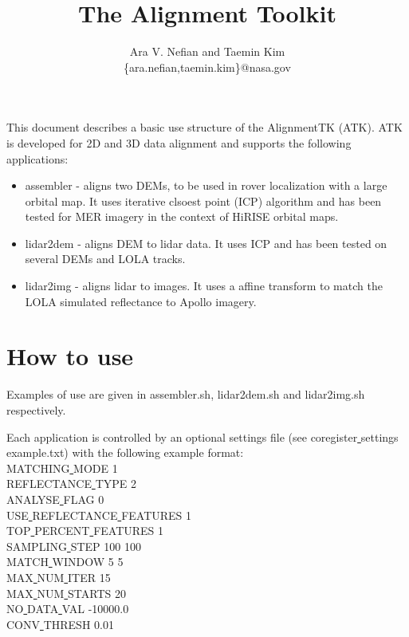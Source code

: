\documentclass[12pt]{article}
\begin{document}
\title {The Alignment Toolkit}
\author{Ara V. Nefian and Taemin Kim\\
\{ara.nefian,taemin.kim\}@nasa.gov}
\maketitle

This document describes a basic use structure of the AlignmentTK (ATK). ATK is developed for 2D and 3D data alignment and supports the 
following applications:
\begin{itemize}
\item assembler - aligns two DEMs, to be used in rover localization with a large orbital map. It uses iterative clsoest point (ICP) algorithm and has 
been tested for MER imagery in the context of HiRISE orbital maps.
\item lidar2dem - aligns DEM to lidar data. It uses ICP and has been tested on several DEMs and LOLA tracks.
\item lidar2img - aligns lidar to images. It uses a affine transform to match the LOLA simulated reflectance to Apollo imagery. 
\end{itemize} 

\section{How to use}
Examples of use are given in assembler.sh, lidar2dem.sh and lidar2img.sh respectively.

Each application is controlled by an optional settings file (see coregister\underline{ }settings\underline{ }example.txt) with the following example format:\\
MATCHING\underline{ }MODE 1\\
REFLECTANCE\underline{ }TYPE 2\\
ANALYSE\underline{ }FLAG 0\\
USE\underline{ }REFLECTANCE\underline{ }FEATURES 1\\
TOP\underline{ }PERCENT\underline{ }FEATURES 1\\
SAMPLING\underline{ }STEP 100 100\\
MATCH\underline{ }WINDOW 5 5\\
MAX\underline{ }NUM\underline{ }ITER 15\\
MAX\underline{ }NUM\underline{ }STARTS 20\\
NO\underline{ }DATA\underline{ }VAL -10000.0\\
CONV\underline{ }THRESH 0.01\\
\end{document}
